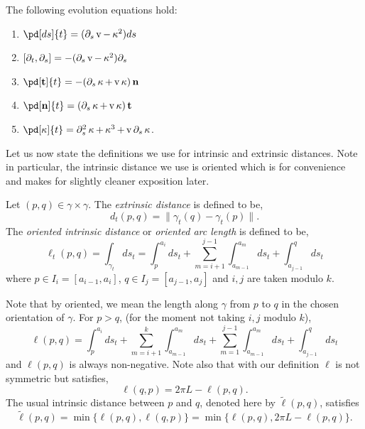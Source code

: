 \documentclass[11pt]{amsart}
\begin{document}
\begin{lemma}
\label{lem:basic_evolution}
The following evolution equations hold:
\begin{enumerate}
\item \(\pd[ds]{t} = (\partial_s \tangspeed - \curvecurv^2) ds\)
\item \([\partial_t, \partial_s] = -(\partial_s \operatorname{v} - \operatorname{\kappa}^2) \partial_s\)
\item \(\pd[\tang]{t} = -(\partial_s \curvecurv + \tangspeed\curvecurv) \nor\)
\item \(\pd[\nor]{t} = (\partial_s \curvecurv + \tangspeed\curvecurv) \tang\)
\item \(\pd[\curvecurv]{t} = \partial_s^2 \curvecurv + \curvecurv^3 + \tangspeed \partial_s \curvecurv\).
\end{enumerate}
\end{lemma}

Let us now state the definitions we use for intrinsic and extrinsic distances. Note in particular, the intrinsic distance we use is oriented which is for convenience and makes for slightly cleaner exposition later.

\begin{defn}
\label{defn:dist}
Let \((p,q) \in \gamma \times \gamma\). The \emph{extrinsic distance} is defined to be,
\[
d_t(p, q) = \|\gamma_t(q) - \gamma_t(p)\|.
\]
The \emph{oriented intrinsic distance} or \emph{oriented arc length} is defined to be,
\[
\ell_t(p, q) = \int_{\gamma_t} ds_t = \int_p^{a_i} ds_t + \sum_{m=i+1}^{j-1} \int_{a_{m-1}}^{a_m} ds_t + \int_{a_{j-1}}^q ds_t
\]
where \(p \in I_i = [a_{i-1}, a_i]\), \(q \in I_j = [a_{j-1}, a_j]\) and \(i,j\) are taken modulo \(k\).
\end{defn}

Note that by oriented, we mean the length along \(\gamma\) from \(p\) to \(q\) in the chosen orientation of \(\gamma\). For \(p > q\), (for the moment not taking \(i,j\) modulo \(k\)),
\[
\ell(p, q) = \int_p^{a_i} ds_t + \sum_{m=i+1}^{k} \int_{a_{m-1}}^{a_m} ds_t + \sum_{m=1}^{j-1} \int_{a_{m-1}}^{a_m} ds_t + \int_{a_{j-1}}^q ds_t
\]
and \(\ell(p, q)\) is always non-negative. Note also that with our definition \(\ell\) is not symmetric but satisfies,
\begin{equation}
\label{eq:ell_symmetry}
\ell(q, p) = 2\pi L - \ell(p, q).
\end{equation}
The usual intrinsic distance between \(p\) and \(q\), denoted here by \(\tilde{\ell}(p, q)\), satisfies
\[
\tilde{\ell}(p, q) = \min\{\ell(p, q), \ell(q, p)\} = \min\{\ell(p, q), 2\pi L - \ell(p, q)\}.
\]
\end{document}
